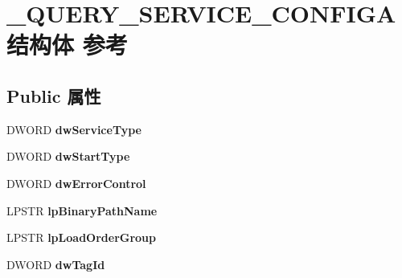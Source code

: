 \hypertarget{struct___q_u_e_r_y___s_e_r_v_i_c_e___c_o_n_f_i_g_a}{}\section{\+\_\+\+Q\+U\+E\+R\+Y\+\_\+\+S\+E\+R\+V\+I\+C\+E\+\_\+\+C\+O\+N\+F\+I\+G\+A结构体 参考}
\label{struct___q_u_e_r_y___s_e_r_v_i_c_e___c_o_n_f_i_g_a}
\subsection*{Public 属性}
\begin{DoxyCompactItemize}
\item 
\mbox{\label{struct___q_u_e_r_y___s_e_r_v_i_c_e___c_o_n_f_i_g_a_a460757243c8930d19afc6de4c3e73646}} 
D\+W\+O\+RD {\bfseries dw\+Service\+Type}
\item 
\mbox{\label{struct___q_u_e_r_y___s_e_r_v_i_c_e___c_o_n_f_i_g_a_aa7048ae14dc41b0ec778673a295b343d}} 
D\+W\+O\+RD {\bfseries dw\+Start\+Type}
\item 
\mbox{\label{struct___q_u_e_r_y___s_e_r_v_i_c_e___c_o_n_f_i_g_a_a349faea802ea513c5bc9fa3614a574f7}} 
D\+W\+O\+RD {\bfseries dw\+Error\+Control}
\item 
\mbox{\label{struct___q_u_e_r_y___s_e_r_v_i_c_e___c_o_n_f_i_g_a_a28d206c4960fafd45b4f7e872d13ccbd}} 
L\+P\+S\+TR {\bfseries lp\+Binary\+Path\+Name}
\item 
\mbox{\label{struct___q_u_e_r_y___s_e_r_v_i_c_e___c_o_n_f_i_g_a_aad0b107ababa124204da294d468f2213}} 
L\+P\+S\+TR {\bfseries lp\+Load\+Order\+Group}
\item 
\mbox{\label{struct___q_u_e_r_y___s_e_r_v_i_c_e___c_o_n_f_i_g_a_a42cc0a88463d7cf58f4132eb5032a939}} 
D\+W\+O\+RD {\bfseries dw\+Tag\+Id}
\item 
\mbox{\label{struct___q_u_e_r_y___s_e_r_v_i_c_e___c_o_n_f_i_g_a_a4b0ccacca33ee396caa5946c6b4514f5}} 

\end{DoxyCompactItemize}
